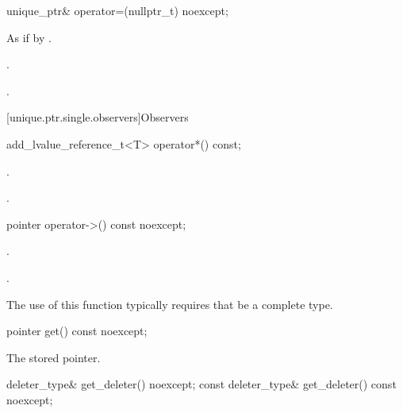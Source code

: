 %
\begin{itemdecl}
unique_ptr& operator=(nullptr_t) noexcept;
\end{itemdecl}

\begin{itemdescr}
\pnum
\effects
As if by .

\pnum
\ensures
{}.

\pnum
\returns
{}.
\end{itemdescr}

[unique.ptr.single.observers]{Observers}

%
\begin{itemdecl}
add_lvalue_reference_t<T> operator*() const;
\end{itemdecl}

\begin{itemdescr}
\pnum
\expects
{}.

\pnum
\returns
{}.

\end{itemdescr}

%
\begin{itemdecl}
pointer operator->() const noexcept;
\end{itemdecl}

\begin{itemdescr}
\pnum
\expects
{}.

\pnum
\returns
{}.

\pnum
\begin{note}
The use of this function typically requires that  be a complete type.
\end{note}
\end{itemdescr}

%
\begin{itemdecl}
pointer get() const noexcept;
\end{itemdecl}

\begin{itemdescr}
\pnum
\returns
The stored pointer.
\end{itemdescr}

%
\begin{itemdecl}
deleter_type& get_deleter() noexcept;
const deleter_type& get_deleter() const noexcept;
\end{itemdecl}

